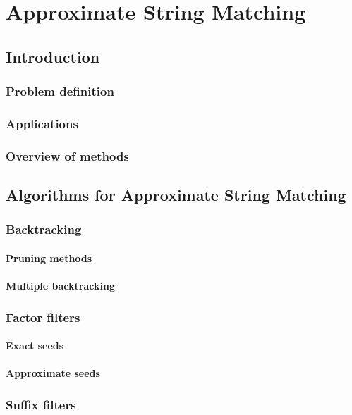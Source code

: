 \part{Approximate String Matching}

\chapter{Introduction}
\section{Problem definition}
\section{Applications}
\section{Overview of methods}

\chapter{Algorithms for Approximate String Matching}
\section{Backtracking}
\subsection{Pruning methods}
\subsection{Multiple backtracking}
\section{Factor filters}
\subsection{Exact seeds}
\subsection{Approximate seeds}
\section{Suffix filters}

